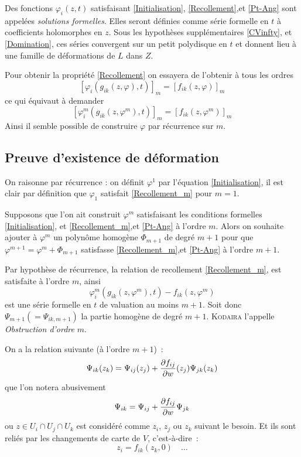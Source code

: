\documentclass[a4paper,10pt,draft,makeidx,twocolumn]{amsart}
\begin{document}
Des fonctions $\varphi_i(z,t)$ satisfaisant \eqref{Initialisation}, \eqref{Recollement},et \eqref{Pt-Ang} sont appelées \emph{solutions formelles}. Elles seront définies comme série formelle en $t$ à coefficients holomorphes en $z$. Sous les hypothèses supplémentaires \eqref{CVinfty}, et \eqref{Domination}, ces séries convergent sur un petit polydisque en $t$ et donnent lieu à une famille de déformations de $L$ dans $Z$.

Pour obtenir la propriété \eqref{Recollement} on essayera de l'obtenir à tous les ordres
\begin{equation}\label{recollement_m}
\left[\varphi_i(g_{ik}(z,\varphi),t)\right]_m = \left[f_{ik}(z, \varphi)\right]_m
\end{equation}
ce qui équivaut à demander
\begin{equation}\label{Recollement_m}
\left[\varphi^m_i(g_{ik}(z,\varphi^m),t)\right]_m = \left[f_{ik}(z, \varphi^m)\right]_m
\end{equation}
Ainsi il semble possible de construire $\varphi$ par récurrence sur $m$.

\subsection{Preuve d'existence de déformation}
On raisonne par récurrence : on définit $\varphi^1$ par l'équation \eqref{Initialisation}, il est clair par définition que $\varphi_1$ satisfait \eqref{Recollement_m} pour $m=1$.

Supposons que l'on ait construit $\varphi^m$ satisfaisant les conditions formelles \eqref{Initialisation}, et \eqref{Recollement_m},et \eqref{Pt-Ang} à l'ordre $m$. Alors on souhaite ajouter à $\varphi^m$ un polynôme homogène $\Phi_{m+1}$ de degré $m+1$ pour que $\varphi^{m+1} = \varphi^m + \Phi_{m+1}$ satisfasse  \eqref{Recollement_m},et \eqref{Pt-Ang} à l'ordre $m+1$.

Par hypothèse de récurrence, la relation de recollement \eqref{Recollement_m}, est satisfaite à l'ordre $m$, ainsi
\begin{equation}
\varphi^m_i(g_{ik}(z,\varphi^m),t) - f_{ik}(z, \varphi^m)
\end{equation}
est une série formelle en $t$ de valuation au moins $m+1$. Soit donc $\Psi_{m+1} (=\Psi_{ik, m+1})$ la partie homogène de degré $m+1$. \textsc{Kodaira} l'appelle \emph{Obstruction d'ordre} $m$.

On a la relation suivante (à l'ordre $m+1$)~:
\begin{equation}
\Psi_{ik}(z_k) = \Psi_{ij}(z_j) + \dfrac{\partial{f_{ij}}}{\partial{w}}(z_j)\Psi_{jk}(z_k)
\end{equation}
que l'on notera abusivement
\begin{equation}
\Psi_{ik} = \Psi_{ij} + \dfrac{\partial{f_{ij}}}{\partial{w}}\Psi_{jk}
\end{equation}
ou $z \in U_i \cap U_j \cap U_k$ est considéré comme $z_i$, $z_j$ ou $z_k$ suivant le besoin. Et ils sont reliés par les changements de carte de $V$, c'est-à-dire~:
\begin{equation}
z_i = f_{ik}(z_k,0) \quad \dots
\end{equation}
\end{document}
